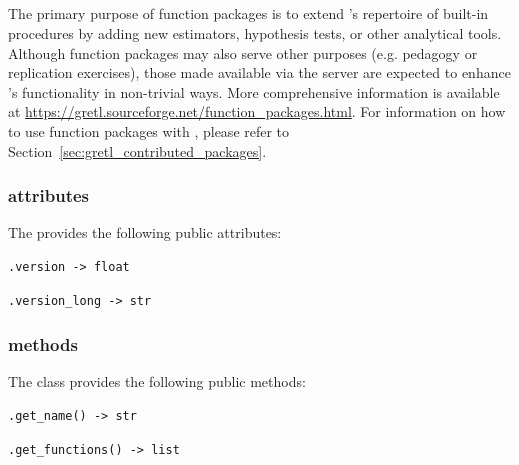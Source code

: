 \subsection[gretl.Package class]{\classpypackageb}\label{sec:classpypackage}
The primary purpose of \gretl function packages is to extend
\gretl's repertoire of built-in procedures by adding new
estimators, hypothesis tests, or other analytical tools.
Although function packages may also serve other purposes
(e.g. pedagogy or replication exercises), those made available
via the \gretl server are expected to enhance \gretl's
functionality in non-trivial ways. More comprehensive information
is available at
\url{https://gretl.sourceforge.net/function_packages.html}.
For information on how to use function packages with \gretlpy,
please refer to Section~\ref{sec:gretl_contributed_packages}.

\subsubsection{\classpypackageb attributes}
The \classpypackage provides the following public attributes:

\begin{lstlisting}[style=pythonstylefoot]
.version -> float
\end{lstlisting}

\begin{lstlisting}[style=pythonstylefoot]
.version_long -> str
\end{lstlisting}


\subsubsection{\classpypackageb methods}
The \classpypackage class provides the following public methods:

\begin{lstlisting}[style=pythonstylefoot]
.get_name() -> str
\end{lstlisting}

\label{met:gretlpackage::get_functions}
\begin{lstlisting}[style=pythonstylefoot]
.get_functions() -> list
\end{lstlisting}

